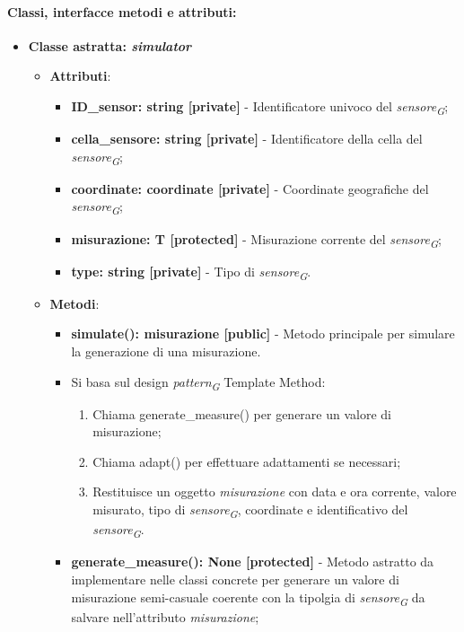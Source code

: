 \paragraph{Classi, interfacce metodi e attributi:}
\begin{itemize}
    \item {\textbf{Classe astratta: \textit{simulator}}}
    \begin{itemize}
        \item \textbf{Attributi}: 
        \begin{itemize}
            \item \textbf{ID\_sensor: string [private]} - Identificatore univoco del \textit{sensore}\textsubscript{\textit{G}};
            \item \textbf{cella\_sensore: string [private]} - Identificatore della cella del \textit{sensore}\textsubscript{\textit{G}};
            \item \textbf{coordinate: coordinate [private]} - Coordinate geografiche del \textit{sensore}\textsubscript{\textit{G}};
            \item \textbf{misurazione: T [protected]} - Misurazione corrente del \textit{sensore}\textsubscript{\textit{G}};
            \item \textbf{type: string [private]} - Tipo di \textit{sensore}\textsubscript{\textit{G}}.
        \end{itemize}
        \item \textbf{Metodi}:
        \begin{itemize}
            \item \textbf{simulate(): misurazione [public]} - Metodo principale per simulare la generazione di una misurazione.
            \item 
            Si basa sul design \textit{pattern}\textsubscript{\textit{G}} Template Method:
            \begin{enumerate}
                \item Chiama generate\_measure() per generare un valore di misurazione;
                \item Chiama adapt() per effettuare adattamenti se necessari;
                \item Restituisce un oggetto \textit{misurazione} con data e ora corrente, valore misurato, tipo di \textit{sensore}\textsubscript{\textit{G}}, coordinate e identificativo del \textit{sensore}\textsubscript{\textit{G}}.
            \end{enumerate}
            \item \textbf{generate\_measure(): None [protected]} - Metodo astratto da implementare nelle classi concrete per generare un valore di misurazione semi-casuale coerente con la tipolgia di \textit{sensore}\textsubscript{\textit{G}} da salvare nell'attributo \textit{misurazione};

\end{itemize}
\end{itemize}
\end{itemize}
